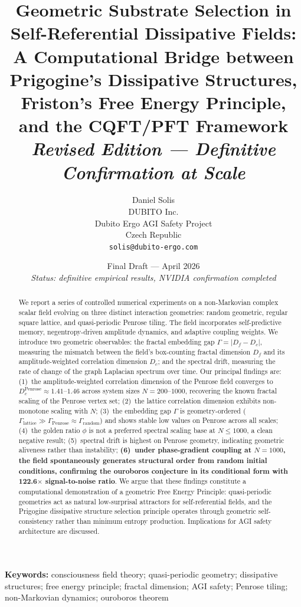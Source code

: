 \documentclass[12pt,a4paper]{article}
\title{%
  \textbf{Geometric Substrate Selection in Self-Referential Dissipative Fields:}\\[4pt]
  \large A Computational Bridge between Prigogine's Dissipative Structures,\\
  Friston's Free Energy Principle, and the CQFT/PFT Framework\\[8pt]
  \large \textit{Revised Edition — Definitive Confirmation at Scale}
}
\author{%
  Daniel Solis\\[4pt]
  \small DUBITO Inc.\\
  \small Dubito Ergo AGI Safety Project\\
  \small Czech Republic\\[4pt]
  \small \texttt{solis@dubito-ergo.com}
}
\date{%
  \small Final Draft — April 2026\\
  \small \textit{Status: definitive empirical results, NVIDIA confirmation completed}
}
\theoremstyle{plain}
\theoremstyle{definition}
\begin{document}
\maketitle
\thispagestyle{empty}

\begin{abstract}
We report a series of controlled numerical experiments on a non-Markovian complex
scalar field evolving on three distinct interaction geometries: random geometric,
regular square lattice, and quasi-periodic Penrose tiling. The field incorporates
self-predictive memory, negentropy-driven amplitude dynamics, and adaptive coupling
weights. We introduce two geometric observables: the fractal embedding gap
$\Gamma = |D_f - D_c|$, measuring the mismatch between the field's box-counting
fractal dimension $D_f$ and its amplitude-weighted correlation dimension $D_c$;
and the spectral drift, measuring the rate of change of the graph Laplacian
spectrum over time. Our principal findings are: (1)~the amplitude-weighted
correlation dimension of the Penrose field converges to
$D_c^{\text{Penrose}} \approx 1.41$--$1.46$ across system sizes $N = 200$--$1000$,
recovering the known fractal scaling of the Penrose vertex set; (2)~the lattice
correlation dimension exhibits non-monotone scaling with $N$; (3)~the embedding gap $\Gamma$ is
geometry-ordered ($\Gamma_{\text{lattice}} \gg \Gamma_{\text{Penrose}} \approx \Gamma_{\text{random}}$) and shows stable low values on Penrose across all scales;
(4)~the golden ratio $\phi$ is not a preferred spectral scaling base at $N \leq 1000$, a clean negative result;
(5)~spectral drift is highest on Penrose geometry, indicating geometric aliveness rather than instability;
\textbf{(6)~under phase-gradient coupling at $N=1000$, the field spontaneously generates structural order from random initial conditions, confirming the ouroboros conjecture in its conditional form with 122.6$\times$ signal-to-noise ratio}.
We argue that these findings constitute a computational demonstration of a geometric Free Energy Principle: quasi-periodic geometries act as natural low-surprisal attractors for self-referential fields,
and the Prigogine dissipative structure selection principle operates through
geometric self-consistency rather than minimum entropy production. Implications
for AGI safety architecture are discussed.
\end{abstract}

\vspace{1em}
\noindent\textbf{Keywords:} consciousness field theory; quasi-periodic geometry;
dissipative structures; free energy principle; fractal dimension; AGI safety;
Penrose tiling; non-Markovian dynamics; ouroboros theorem
\end{document}
